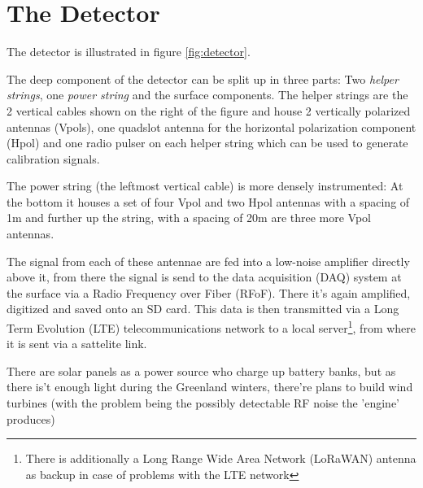 \documentclass[11pt,a4paper,faculty=we,language=en,doctype=report]{cls/ugent-doc}
\begin{document}
\chapter{The Detector}
The detector is illustrated in figure \ref{fig:detector}.

The deep component of the detector can be split up in three parts: Two \textit{helper strings}, one \textit{power string} and the surface components. The helper strings are the 2 vertical cables shown on the right of the figure and house 2 vertically polarized antennas (Vpols), one quadslot antenna for the horizontal polarization component (Hpol) and one radio pulser on each helper string which can be used to generate calibration signals.

The power string (the leftmost vertical cable) is more densely instrumented: At the bottom it houses a set of four Vpol and two Hpol antennas with a spacing of 1m and further up the string, with a spacing of 20m are three more Vpol antennas.

The signal from each of these antennae are fed into a low-noise amplifier directly above it, from there the signal is send to the data acquisition (DAQ) system at the surface via a Radio Frequency over Fiber (RFoF). There it's again amplified, digitized and saved onto an SD card. This data is then transmitted via a Long Term Evolution (LTE) telecommunications network to a local server\footnote{There is additionally a Long Range Wide Area Network (LoRaWAN) antenna as backup in case of problems with the LTE network}, from where it is sent via a sattelite link.

There are solar panels as a power source who charge up battery banks, but as there is't enough light during the Greenland winters, there're plans to build wind turbines (with the problem being the possibly detectable RF noise the 'engine' produces)
\end{document}
